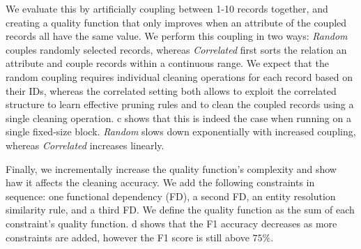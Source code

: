 We evaluate this by artificially coupling between 1-10 records together, and creating a quality function that only improves when an attribute of the coupled records all have the same value.  We perform this coupling in two ways: {\it Random} couples randomly selected records, whereas {\it Correlated} first sorts the relation an attribute and couple records within a continuous range.  We expect that the random coupling requires individual cleaning operations for each record based on their IDs, whereas the correlated setting both allows \sys to exploit the correlated structure to learn effective pruning rules and to clean the coupled records using a single cleaning operation.  c shows that this is indeed the case when running \sys on a single fixed-size block. {\it Random} slows down exponentially with increased coupling, whereas {\it Correlated} increases linearly.


 Finally, we incrementally increase the quality function's complexity and show haw it affects the cleaning accuracy.  We add the following constraints in sequence: one functional dependency (FD), a second FD, an entity resolution similarity rule, and a third FD.  We define the quality function as the sum of each constraint's quality function.   d shows that the F1 accuracy decreases as more constraints are added, however the F1 score is still above $75\%$.  




